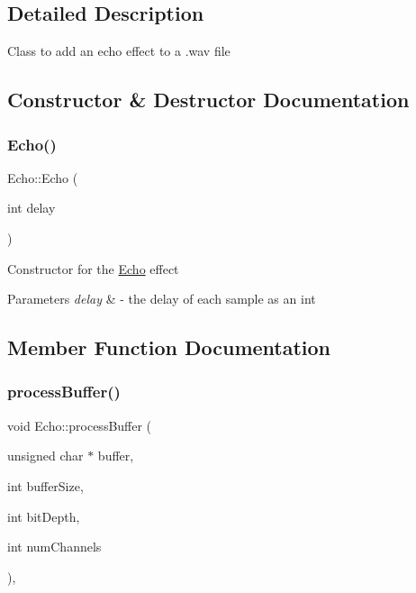 \subsection{Detailed Description}
Class to add an echo effect to a .wav file 

\subsection{Constructor \& Destructor Documentation}
\mbox{\label{classEcho_a9531515ffab8be1e38cbdc0e0e9338a6}} 
\subsubsection{\texorpdfstring{Echo()}{Echo()}}
{\footnotesize\ttfamily Echo\+::\+Echo (\begin{DoxyParamCaption}\item[{int}]{delay }\end{DoxyParamCaption})}

Constructor for the \hyperlink{classEcho}{Echo} effect 
\begin{DoxyParams}{Parameters}
{\em delay} & -\/ the delay of each sample as an int \\
\hline
\end{DoxyParams}


\subsection{Member Function Documentation}
\mbox{\label{classEcho_a1cdbe4bf78f5f6ac9b3609d9cd32de94}} 
\subsubsection{\texorpdfstring{process\+Buffer()}{processBuffer()}}
{\footnotesize\ttfamily void Echo\+::process\+Buffer (\begin{DoxyParamCaption}\item[{unsigned char $\ast$}]{buffer,  }\item[{int}]{buffer\+Size,  }\item[{int}]{bit\+Depth,  }\item[{int}]{num\+Channels }\end{DoxyParamCaption})\hspace{0.3cm}{\ttfamily [override]}, {\ttfamily [virtual]}}

